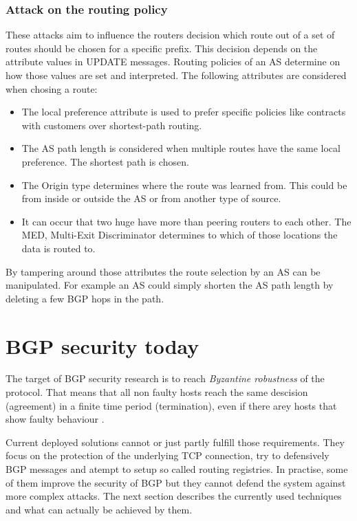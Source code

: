 \documentclass[12pt,a4paper]{IEEEtran}
\begin{document}
		\subsubsection{Attack on the routing policy} 
		
		These attacks aim to influence the routers decision which route out of a set of routes should be chosen for a specific prefix. This decision depends on the attribute values in UPDATE messages. Routing policies of an AS determine on how those values are set and interpreted. The following attributes are considered when chosing a route:
		\begin{itemize}
			\item The local preference attribute is used to prefer specific policies like contracts with customers over shortest-path routing.
			\item The AS path length is considered when multiple routes have the same local preference. The shortest path is chosen.
			\item The Origin type determines where the route was learned from. This could be from inside or outside the AS or from another type of source.
			\item It can occur that two huge have more than peering routers to each other. The MED, Multi-Exit Discriminator determines to which of those locations the data is routed to. 
		\end{itemize}
		By tampering around those attributes the route selection by an AS can be manipulated. 
		For example an AS could simply shorten the AS path length by deleting a few BGP hops in the path.

       \section{BGP security today}
		The target of BGP security research is to reach \emph{Byzantine robustness} of the protocol. That means that all non faulty hosts reach the same descision (agreement) in a finite time period (termination), even if there arey hosts that show faulty behaviour \citep{Butler2010}.
		
		Current deployed solutions cannot or just partly fulfill those requirements. They focus on the protection of the underlying TCP connection, try to defensively BGP messages and atempt to setup so called routing registries. In practise, some of them improve the security of BGP but they cannot defend the system against more complex attacks. The next section describes the currently used techniques and what can actually be achieved by them. 
\end{document}
